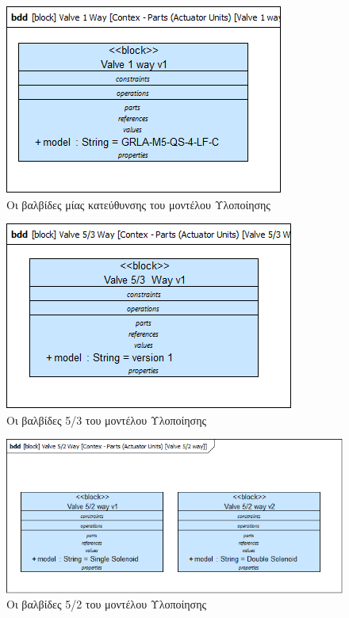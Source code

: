 \documentclass[a4paper,12pt,twoside]{report}
\begin{document}
\begin{appendices}
				\begin{figure}[hp]
					\centering
					\includegraphics[scale=0.50]{DesignModel_Contex-Parts(ActuatorUnits)[Valve1way].png}
					\caption{Οι βαλβίδες μίας κατεύθυνσης του μοντέλου Υλοποίησης}
					\label{φωτ:Οι βαλβίδες μίας κατεύθυνσης του μοντέλου Υλοποίησης}
				\end{figure}
				
				\begin{figure}[hp]
					\centering
					\includegraphics[scale=0.50]{DesignModel_Contex-Parts(ActuatorUnits)[Valve5-3Way].png}
					\caption{Οι βαλβίδες 5/3 του μοντέλου Υλοποίησης}
					\label{φωτ:Οι βαλβίδες 5/3 του μοντέλου Υλοποίησης}
				\end{figure}
				
				\begin{figure}[hp]
					\centering
					\includegraphics[scale=0.50]{DesignModel_Contex-Parts(ActuatorUnits)[Valve5-2way].png}
					\caption{Οι βαλβίδες 5/2 του μοντέλου Υλοποίησης}
					\label{φωτ:Οι βαλβίδες 5/2 του μοντέλου Υλοποίησης}
				\end{figure}
				

\end{appendices}
\end{document}
